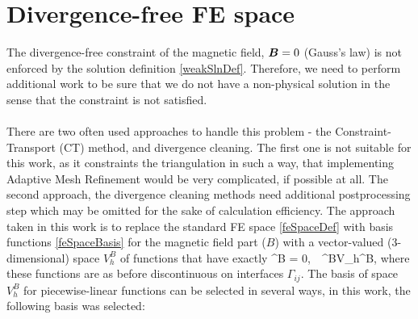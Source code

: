 \section{Divergence-free FE space}
The divergence-free constraint of the magnetic field, $\mbox{\boldmath $B$} = 0$ (Gauss's law) is not enforced by the solution definition \ref{weakSlnDef}. Therefore, we need to perform additional work to be sure that we do not have a non-physical solution in the sense that the constraint is not satisfied.
\paragraph{}
There are two often used approaches to handle this problem - the Constraint-Transport (CT) method, and divergence cleaning. The first one is not suitable for this work, as it constraints the triangulation in such a way, that implementing Adaptive Mesh Refinement would be very complicated, if possible at all. The second approach, the divergence cleaning methods need additional postprocessing step which may be omitted for the sake of calculation efficiency. The approach taken in this work is to replace the standard FE space  \ref{feSpaceDef} with basis functions \ref{feSpaceBasis} for the magnetic field part ($B$) with a vector-valued (3-dimensional) space $V_h^B$ of functions that have exactly
\be
\nabla \cdot \mrvh^B = 0,\ \ \mrvh^B\in V_h^B,
\ee
where these functions are as before discontinuous on interfaces $\Gamma_{ij}$.
The basis of space $V_h^B$ for piecewise-linear functions can be selected in several ways, in this work, the following basis was selected:
